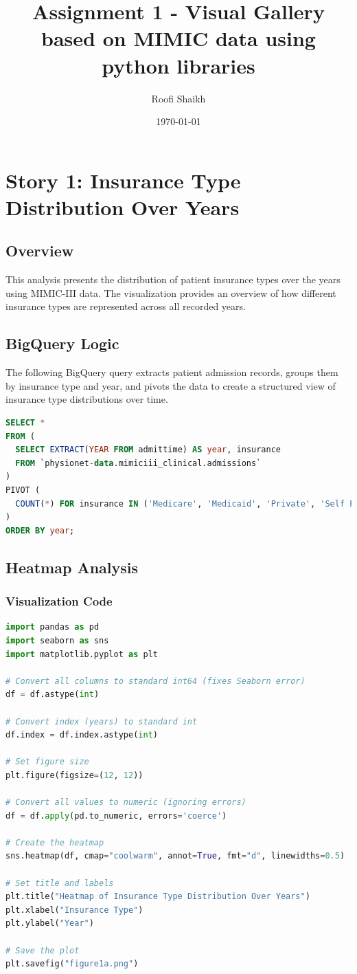 \documentclass[a4paper,10pt]{article}
\title{Assignment 1 - Visual Gallery based on MIMIC data using python libraries}
\author{Roofi Shaikh }
\date{\today}
\begin{document}
\maketitle

\section{Story 1: Insurance Type Distribution Over Years}

\subsection{Overview}
This analysis presents the distribution of patient insurance types over the years using MIMIC-III data. The visualization provides an overview of how different insurance types are represented across all recorded years.

\subsection{BigQuery Logic}
The following BigQuery query extracts patient admission records, groups them by insurance type and year, and pivots the data to create a structured view of insurance type distributions over time.

\begin{lstlisting}[language=SQL]
%%bigquery df --project bigaquery-aihc-assign1
SELECT * 
FROM (
  SELECT EXTRACT(YEAR FROM admittime) AS year, insurance 
  FROM `physionet-data.mimiciii_clinical.admissions`
)
PIVOT (
  COUNT(*) FOR insurance IN ('Medicare', 'Medicaid', 'Private', 'Self Pay', 'Government')
)
ORDER BY year;
\end{lstlisting}

\subsection{Heatmap Analysis}

\subsubsection{Visualization Code}
\begin{lstlisting}[language=Python]
import pandas as pd
import seaborn as sns
import matplotlib.pyplot as plt

# Convert all columns to standard int64 (fixes Seaborn error)
df = df.astype(int)  

# Convert index (years) to standard int
df.index = df.index.astype(int)

# Set figure size
plt.figure(figsize=(12, 12))

# Convert all values to numeric (ignoring errors)
df = df.apply(pd.to_numeric, errors='coerce')

# Create the heatmap
sns.heatmap(df, cmap="coolwarm", annot=True, fmt="d", linewidths=0.5)

# Set title and labels
plt.title("Heatmap of Insurance Type Distribution Over Years")
plt.xlabel("Insurance Type")
plt.ylabel("Year")

# Save the plot
plt.savefig("figure1a.png")
\end{lstlisting}
\end{document}
